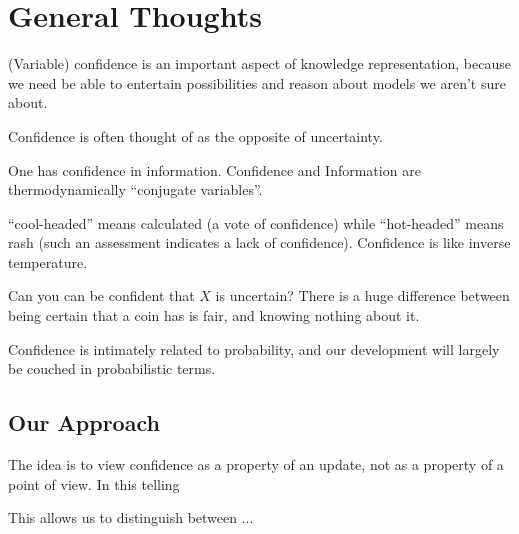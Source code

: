 \documentclass{article}
\begin{document}
\section{General Thoughts}
(Variable) confidence is an important aspect of knowledge representation, because we need be able to entertain possibilities and reason about models we aren't sure about.

Confidence is often thought of as the opposite of uncertainty.


One has confidence in information.
Confidence and Information are thermodynamically ``conjugate variables''.


``cool-headed'' means calculated (a vote of confidence) while ``hot-headed'' means rash (such an assessment indicates a lack of confidence). Confidence is like inverse temperature.

Can you can be confident that $X$ is uncertain?
There is a huge difference between being certain that a coin has is fair, and knowing nothing about it.



Confidence is intimately related to probability, and our development will largely be couched in probabilistic terms.



\subsection*{Our Approach}
The idea is to view confidence as a property of an update, not as a property of a point of view.
In this telling

This allows us to distinguish between ...
%

%
%
\end{document}

